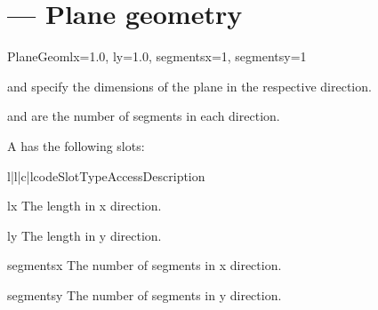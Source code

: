 
\section{ ---
         Plane geometry}

\begin{classdesc}{PlaneGeom}{lx=1.0, ly=1.0, segmentsx=1, segmentsy=1}

 and  specify the dimensions of the plane in
the respective direction.

 and  are the number of
segments in each direction.
\end{classdesc}

A  has the following slots:

\begin{tableiv}{l|l|c|l}{code}{Slot}{Type}{Access}{Description}
\end{tableiv}

\begin{memberdesc}{lx}
The length in x direction.
\end{memberdesc}

\begin{memberdesc}{ly}
The length in y direction.
\end{memberdesc}

\begin{memberdesc}{segmentsx}
The number of segments in x direction.
\end{memberdesc}

\begin{memberdesc}{segmentsy}
The number of segments in y direction.
\end{memberdesc}







